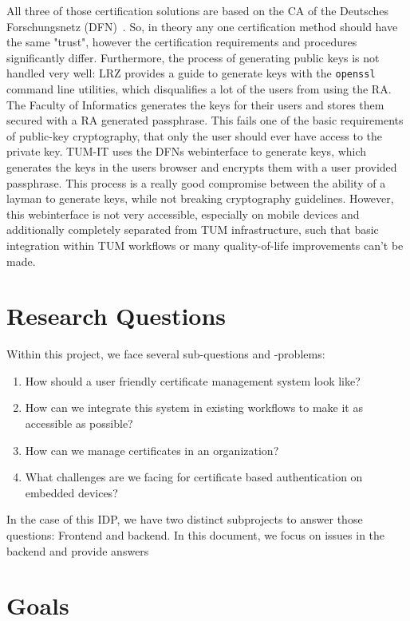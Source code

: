 All three of those certification solutions are based on the CA of the Deutsches Forschungsnetz (DFN)~\cite{dfnPki}.
So, in theory any one certification method should have the same "trust", however the certification requirements and
procedures significantly differ.
Furthermore, the process of generating public keys is not handled very well: LRZ provides a guide to generate keys with
the \lstinline{openssl} command line utilities, which disqualifies a lot of the users from using the RA\@.
The Faculty of Informatics generates the keys for their users and stores them secured with a RA generated passphrase.
This fails one of the basic requirements of public-key cryptography, that only the user should ever have access to the
private key.
TUM-IT uses the DFNs webinterface to generate keys, which generates the keys in the users browser and encrypts them with
a user provided passphrase.
This process is a really good compromise between the ability of a layman to generate keys, while not breaking
cryptography guidelines.
However, this webinterface is not very accessible, especially on mobile devices and additionally completely separated
from TUM infrastructure, such that basic integration within TUM workflows or many quality-of-life improvements can't be
made.

\section{Research Questions}\label{sec:researchQuestions}
Within this project, we face several sub-questions and -problems:
\begin{enumerate}
    \item How should a user friendly certificate management system look like?
    \item How can we integrate this system in existing workflows to make it as accessible as possible?
    \item How can we manage certificates in an organization?
    \item What challenges are we facing for certificate based authentication on embedded devices?
\end{enumerate}

In the case of this IDP, we have two distinct subprojects to answer those questions: Frontend and backend.
In this document, we focus on issues in the backend and provide answers

\section{Goals}\label{sec:goals}

